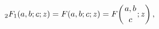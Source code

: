 \[\mathop{{{}_{2}F_{1}}\/}\nolimits\!\left(a,b;c;z\right)=\mathop{F\/}\nolimits%
\!\left(a,b;c;z\right)=\mathop{F\/}\nolimits\!\left({a,b\atop c};z\right),\]
